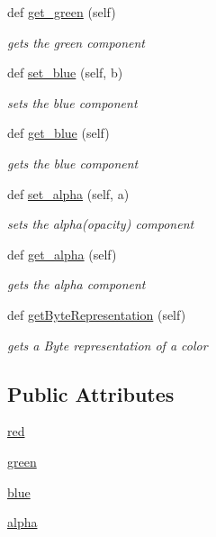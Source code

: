\begin{DoxyCompactItemize}
def \mbox{\hyperlink{class_bridges_1_1_color_1_1_color_adf7fc94b1b5887936da71b361ead3e51}{get\+\_\+green}} (self)
\begin{DoxyCompactList}\small\item\em gets the green component \end{DoxyCompactList}\item 
def \mbox{\hyperlink{class_bridges_1_1_color_1_1_color_a5b298c7b23b82e2599377ec79f199362}{set\+\_\+blue}} (self, b)
\begin{DoxyCompactList}\small\item\em sets the blue component \end{DoxyCompactList}\item 
def \mbox{\hyperlink{class_bridges_1_1_color_1_1_color_abdcf7f0ca2f7288e58dad6f7ea5b9824}{get\+\_\+blue}} (self)
\begin{DoxyCompactList}\small\item\em gets the blue component \end{DoxyCompactList}\item 
def \mbox{\hyperlink{class_bridges_1_1_color_1_1_color_a3dbced3824a73df14c8bf810d445238e}{set\+\_\+alpha}} (self, a)
\begin{DoxyCompactList}\small\item\em sets the alpha(opacity) component \end{DoxyCompactList}\item 
def \mbox{\hyperlink{class_bridges_1_1_color_1_1_color_aee2ff0c486cfd6d4f3261b79bafeb2d5}{get\+\_\+alpha}} (self)
\begin{DoxyCompactList}\small\item\em gets the alpha component \end{DoxyCompactList}\item 
def \mbox{\hyperlink{class_bridges_1_1_color_1_1_color_a13edd205c32eb199664b87f0145f50fe}{get\+Byte\+Representation}} (self)
\begin{DoxyCompactList}\small\item\em gets a Byte representation of a color \end{DoxyCompactList}\end{DoxyCompactItemize}
\subsection*{Public Attributes}
\begin{DoxyCompactItemize}
\item 
\mbox{\hyperlink{class_bridges_1_1_color_1_1_color_a51436cc5661d40acb09332e7bc9a13b7}{red}}
\item 
\mbox{\hyperlink{class_bridges_1_1_color_1_1_color_a28cfec830c2711349e63446c639467b2}{green}}
\item 
\mbox{\hyperlink{class_bridges_1_1_color_1_1_color_afc4245f86380876a9014a55c6fae4dab}{blue}}
\item 
\mbox{\hyperlink{class_bridges_1_1_color_1_1_color_afc73e1d4c91bceaa293dc2525fe51a84}{alpha}}
\end{DoxyCompactItemize}

